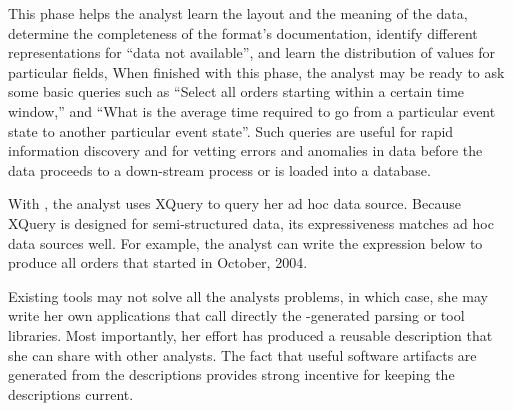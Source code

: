 This phase helps the analyst learn the layout and the meaning of the
data, determine the completeness of the format's documentation,
identify different representations for ``data not available'', and
learn the distribution of values for particular fields, \etc{}  When
finished with this phase, the analyst may be ready to ask some basic
queries such as ``Select all orders starting within a certain time
window,'' and ``What is the average time required to go from a
particular event state to another particular event state''.  Such
queries are useful for rapid information discovery and for vetting
errors and anomalies in data before the data proceeds to a
down-stream process or is loaded into a database.

With \pads{}, the analyst uses XQuery to query her ad hoc data source.
Because XQuery is designed for semi-structured data, its
expressiveness matches ad hoc data sources well.  For example, the
analyst can write the expression below to produce all orders
that started in October, 2004.

Existing \pads{} tools may not solve all the analysts problems,
in which case, she may write her own \pads{} applications that call  directly
the \pads{}-generated parsing or tool libraries.  Most
importantly, her effort has produced a reusable description that she
can share with other analysts.  The fact that useful software
artifacts are generated from the descriptions provides strong
incentive for keeping the descriptions current.



